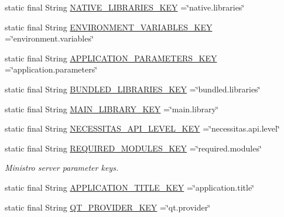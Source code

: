 \begin{DoxyCompactItemize}
\item 
static final String \hyperlink{classorg_1_1kde_1_1necessitas_1_1origo_1_1_qt_activity_a56918618fb324be7fa3dd6597f62950c}{N\-A\-T\-I\-V\-E\-\_\-\-L\-I\-B\-R\-A\-R\-I\-E\-S\-\_\-\-K\-E\-Y} =\char`\"{}native.\-libraries\char`\"{}
\item 
static final String \hyperlink{classorg_1_1kde_1_1necessitas_1_1origo_1_1_qt_activity_aef2f5cd34cd8064e99b9cc5592ad5ee0}{E\-N\-V\-I\-R\-O\-N\-M\-E\-N\-T\-\_\-\-V\-A\-R\-I\-A\-B\-L\-E\-S\-\_\-\-K\-E\-Y} =\char`\"{}environment.\-variables\char`\"{}
\item 
static final String \hyperlink{classorg_1_1kde_1_1necessitas_1_1origo_1_1_qt_activity_ad4cb5451db5a5ae0c174220a66459496}{A\-P\-P\-L\-I\-C\-A\-T\-I\-O\-N\-\_\-\-P\-A\-R\-A\-M\-E\-T\-E\-R\-S\-\_\-\-K\-E\-Y} =\char`\"{}application.\-parameters\char`\"{}
\item 
static final String \hyperlink{classorg_1_1kde_1_1necessitas_1_1origo_1_1_qt_activity_ac523e9851340bb3af119428162561bf1}{B\-U\-N\-D\-L\-E\-D\-\_\-\-L\-I\-B\-R\-A\-R\-I\-E\-S\-\_\-\-K\-E\-Y} =\char`\"{}bundled.\-libraries\char`\"{}
\item 
static final String \hyperlink{classorg_1_1kde_1_1necessitas_1_1origo_1_1_qt_activity_aba6131e6b2689a0fb0309814bde8b599}{M\-A\-I\-N\-\_\-\-L\-I\-B\-R\-A\-R\-Y\-\_\-\-K\-E\-Y} =\char`\"{}main.\-library\char`\"{}
\item 
static final String \hyperlink{classorg_1_1kde_1_1necessitas_1_1origo_1_1_qt_activity_a0641594e636e66172dac05565c7ca816}{N\-E\-C\-E\-S\-S\-I\-T\-A\-S\-\_\-\-A\-P\-I\-\_\-\-L\-E\-V\-E\-L\-\_\-\-K\-E\-Y} =\char`\"{}necessitas.\-api.\-level\char`\"{}
\item 
static final String \hyperlink{classorg_1_1kde_1_1necessitas_1_1origo_1_1_qt_activity_ab4dda3bbed3086481434f40629f026a2}{R\-E\-Q\-U\-I\-R\-E\-D\-\_\-\-M\-O\-D\-U\-L\-E\-S\-\_\-\-K\-E\-Y} =\char`\"{}required.\-modules\char`\"{}
\begin{DoxyCompactList}\small\item\em Ministro server parameter keys. \end{DoxyCompactList}\item 
static final String \hyperlink{classorg_1_1kde_1_1necessitas_1_1origo_1_1_qt_activity_ace0f550c2c05dcc93164c547d17d01d6}{A\-P\-P\-L\-I\-C\-A\-T\-I\-O\-N\-\_\-\-T\-I\-T\-L\-E\-\_\-\-K\-E\-Y} =\char`\"{}application.\-title\char`\"{}
\item 
static final String \hyperlink{classorg_1_1kde_1_1necessitas_1_1origo_1_1_qt_activity_af7b23fdd694e3ec86e72ac81fdec1e6c}{Q\-T\-\_\-\-P\-R\-O\-V\-I\-D\-E\-R\-\_\-\-K\-E\-Y} =\char`\"{}qt.\-provider\char`\"{}

\end{DoxyCompactItemize}
